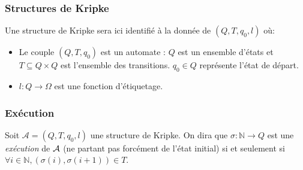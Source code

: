 \documentclass[10pt,a4paper]{article}
\begin{document}
\subsubsection{Structures de Kripke}
Une structure de Kripke sera ici identifié à la donnée de $(Q,T,q_0,l)$ où:
\begin{itemize}
\item Le couple $(Q,T, q_0)$ est un automate : $Q$ est un ensemble d'états et $T \subseteq Q \times Q$ est l'ensemble des transitions. $q_0 \in Q$ représente l'état de départ.
\item $l : Q \to \Omega$ est une fonction d'étiquetage.
\end{itemize}

\subsubsection{Exécution}
Soit $\mathcal{A} = (Q,T,q_0,l)$ une structure de Kripke.
On dira que $\sigma : \mathbb{N} \to Q$ est une \emph{exécution} de $\cal{A}$ (ne partant pas forcément de l'état initial) si et seulement si $\forall i \in \mathbb{N}, (\sigma (i), \sigma (i+1)) \in T$.
\end{document}
